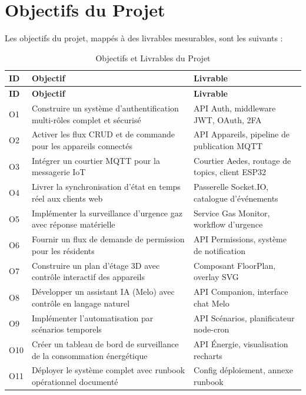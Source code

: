 \section{Objectifs du Projet}

Les objectifs du projet, mappés à des livrables mesurables, sont les suivants :

\begin{center}
\begin{longtable}{p{} p{} p{}}
\caption{Objectifs et Livrables du Projet}\label{tab:objectifs}\\
\toprule
\textbf{ID} & \textbf{Objectif} & \textbf{Livrable} \\
\midrule
\endfirsthead
\toprule
\textbf{ID} & \textbf{Objectif} & \textbf{Livrable} \\
\midrule
\endhead
\bottomrule
\endfoot
O1  & Construire un système d'authentification multi-rôles complet et sécurisé & API Auth, middleware JWT, OAuth, 2FA \\
O2  & Activer les flux CRUD et de commande pour les appareils connectés & API Appareils, pipeline de publication MQTT \\
O3  & Intégrer un courtier MQTT pour la messagerie IoT & Courtier Aedes, routage de topics, client ESP32 \\
O4  & Livrer la synchronisation d'état en temps réel aux clients web & Passerelle Socket.IO, catalogue d'événements \\
O5  & Implémenter la surveillance d'urgence gaz avec réponse matérielle & Service Gas Monitor, workflow d'urgence \\
O6  & Fournir un flux de demande de permission pour les résidents & API Permissions, système de notification \\
O7  & Construire un plan d'étage 3D avec contrôle interactif des appareils & Composant FloorPlan, overlay SVG \\
O8  & Développer un assistant IA (Melo) avec contrôle en langage naturel & API Companion, interface chat Melo \\
O9  & Implémenter l'automatisation par scénarios temporels & API Scénarios, planificateur node-cron \\
O10 & Créer un tableau de bord de surveillance de la consommation énergétique & API Énergie, visualisation recharts \\
O11 & Déployer le système complet avec runbook opérationnel documenté & Config déploiement, annexe runbook \\
\end{longtable}
\end{center}

